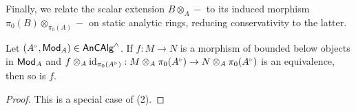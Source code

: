 Finally, we relate the scalar extension $B\otimes_{A}-$ to its induced morphism $\pi_{0}(B)\otimes_{\pi_{0}(A)}-$ on static analytic rings, reducing conservativity to the latter.
\begin{lemma}\label{lem: conservativity of bounded below}
    Let $(A^{\tri},\Mod_{A})\in\An\CAlg^{\wedge}$. If $f:M\to N$ is a morphism of bounded below objects in $\mathsf{Mod}_{A}$ and $f\otimes_{A}\id_{\pi_{0}(A^{\tri})}:M\otimes_{A}\pi_{0}(A^{\tri})\to N\otimes_{A}\pi_{0}(A^{\tri})$ is an equivalence, then so is $f$. 
\end{lemma}
\begin{proof}
    This is a special case of  (2). 
\end{proof}